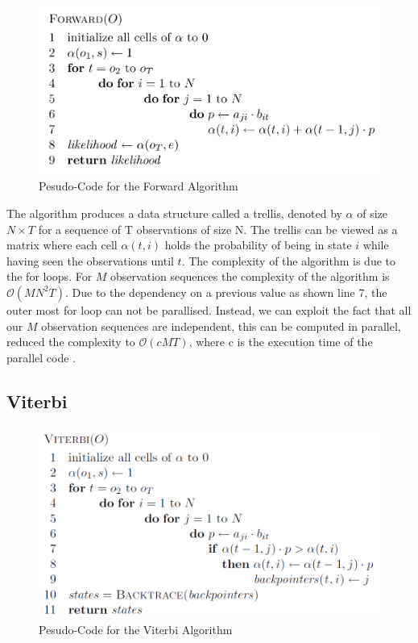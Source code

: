 \documentclass[english, paper=a4]{scrartcl}
\begin{document}
\begin{figure}[H]

\centering
\includegraphics[scale=0.4]{"FW"}
 \caption{Pesudo-Code for the Forward Algorithm \cite{cuhmm}}

\end{figure}

The algorithm produces a data structure called a trellis, denoted by \(\alpha\) of size \(N \times T \) for a sequence of T observations of size N. The trellis can be viewed as a matrix where each cell \(\alpha(t,i)\) holds the probability of being in state \(i\) while having seen the observations until \(t\). The complexity of the algorithm is due to the for loops. For \(M\) observation sequences the complexity of the algorithm is 
$\mathcal{O}(MN^2T)$. Due to the dependency on a previous value as shown line 7, the outer most for loop can not be parallised. Instead, we can exploit the fact that all our \(M\) observation sequences are independent, this can be computed in parallel, reduced the complexity to $\mathcal{O}(cMT)$, where c is the execution time of the parallel code \cite{cuhmm}.
\subsection{Viterbi}

\begin{figure}[H]

\centering
\includegraphics[scale=0.4]{"vit"}
 \caption{Pesudo-Code for the Viterbi Algorithm \cite{cuhmm}}

\end{figure}
\end{document}
